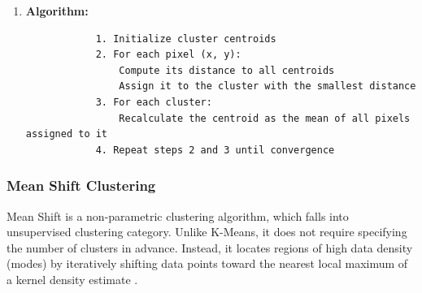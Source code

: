 \documentclass[conference]{IEEEtran}
\begin{document}
\begin{enumerate}
			
		\item \textbf{Algorithm:}
		\begin{lstlisting}
			1. Initialize cluster centroids
			2. For each pixel (x, y):
				Compute its distance to all centroids
				Assign it to the cluster with the smallest distance
			3. For each cluster:
				Recalculate the centroid as the mean of all pixels assigned to it
			4. Repeat steps 2 and 3 until convergence
		\end{lstlisting}
	\end{enumerate}

\subsubsection{Mean Shift Clustering}
	Mean Shift is a non-parametric clustering algorithm, which falls into unsupervised clustering category. Unlike K-Means, it does not require specifying the number of clusters in advance. Instead, it locates regions of high data density (modes) by iteratively shifting data points toward the nearest local maximum of a kernel density estimate \cite{comaniciu2002mean}.
	
\end{document}
